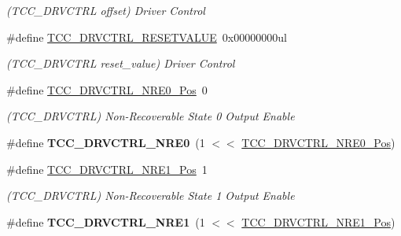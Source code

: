 \begin{DoxyCompactItemize}
\begin{DoxyCompactList}\small\item\em (T\+C\+C\+\_\+\+D\+R\+V\+C\+T\+R\+L offset) Driver Control \end{DoxyCompactList}\item 
\hypertarget{group___s_a_m_l21___t_c_c_gabc9ac4cfde948ebe51ea3f2ac4bac0e2}{}\#define \hyperlink{group___s_a_m_l21___t_c_c_gabc9ac4cfde948ebe51ea3f2ac4bac0e2}{T\+C\+C\+\_\+\+D\+R\+V\+C\+T\+R\+L\+\_\+\+R\+E\+S\+E\+T\+V\+A\+L\+U\+E}~0x00000000ul\label{group___s_a_m_l21___t_c_c_gabc9ac4cfde948ebe51ea3f2ac4bac0e2}

\begin{DoxyCompactList}\small\item\em (T\+C\+C\+\_\+\+D\+R\+V\+C\+T\+R\+L reset\+\_\+value) Driver Control \end{DoxyCompactList}\item 
\hypertarget{group___s_a_m_l21___t_c_c_ga81ac8e4b1215293b26ae5f17e89f9501}{}\#define \hyperlink{group___s_a_m_l21___t_c_c_ga81ac8e4b1215293b26ae5f17e89f9501}{T\+C\+C\+\_\+\+D\+R\+V\+C\+T\+R\+L\+\_\+\+N\+R\+E0\+\_\+\+Pos}~0\label{group___s_a_m_l21___t_c_c_ga81ac8e4b1215293b26ae5f17e89f9501}

\begin{DoxyCompactList}\small\item\em (T\+C\+C\+\_\+\+D\+R\+V\+C\+T\+R\+L) Non-\/\+Recoverable State 0 Output Enable \end{DoxyCompactList}\item 
\hypertarget{group___s_a_m_l21___t_c_c_ga95e51b94e3879a7ec6a897b7e4c58a70}{}\#define {\bfseries T\+C\+C\+\_\+\+D\+R\+V\+C\+T\+R\+L\+\_\+\+N\+R\+E0}~(1 $<$$<$ \hyperlink{group___s_a_m_l21___t_c_c_ga81ac8e4b1215293b26ae5f17e89f9501}{T\+C\+C\+\_\+\+D\+R\+V\+C\+T\+R\+L\+\_\+\+N\+R\+E0\+\_\+\+Pos})\label{group___s_a_m_l21___t_c_c_ga95e51b94e3879a7ec6a897b7e4c58a70}

\item 
\hypertarget{group___s_a_m_l21___t_c_c_ga05f423e4eaafa9706a868792c1a07b6d}{}\#define \hyperlink{group___s_a_m_l21___t_c_c_ga05f423e4eaafa9706a868792c1a07b6d}{T\+C\+C\+\_\+\+D\+R\+V\+C\+T\+R\+L\+\_\+\+N\+R\+E1\+\_\+\+Pos}~1\label{group___s_a_m_l21___t_c_c_ga05f423e4eaafa9706a868792c1a07b6d}

\begin{DoxyCompactList}\small\item\em (T\+C\+C\+\_\+\+D\+R\+V\+C\+T\+R\+L) Non-\/\+Recoverable State 1 Output Enable \end{DoxyCompactList}\item 
\hypertarget{group___s_a_m_l21___t_c_c_ga02cb5c1fc7ebf10a84f67a2888cad7c4}{}\#define {\bfseries T\+C\+C\+\_\+\+D\+R\+V\+C\+T\+R\+L\+\_\+\+N\+R\+E1}~(1 $<$$<$ \hyperlink{group___s_a_m_l21___t_c_c_ga05f423e4eaafa9706a868792c1a07b6d}{T\+C\+C\+\_\+\+D\+R\+V\+C\+T\+R\+L\+\_\+\+N\+R\+E1\+\_\+\+Pos})\label{group___s_a_m_l21___t_c_c_ga02cb5c1fc7ebf10a84f67a2888cad7c4}


\end{DoxyCompactItemize}

